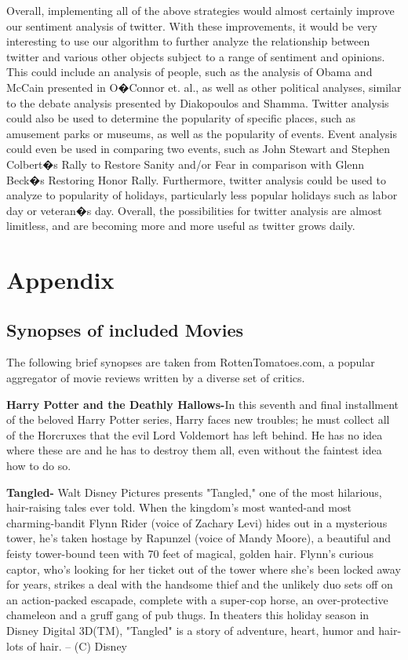 \documentclass[11pt]{article}
\begin{document}
Overall, implementing all of the above strategies would almost certainly improve our sentiment analysis of twitter.  With these improvements, it would be very interesting to use our algorithm to further analyze the relationship  between twitter and various other objects subject to a range of sentiment and opinions.  This could include an analysis of people, such as the analysis of Obama and McCain presented in O�Connor et. al., as well as other political analyses, similar to the debate analysis presented by Diakopoulos and Shamma.  Twitter analysis could also be used to determine the popularity of specific places, such as amusement parks or museums, as well as the popularity of events.  Event analysis could even be used in comparing two events, such as John Stewart and Stephen Colbert�s Rally to Restore Sanity and/or Fear in comparison with Glenn Beck�s Restoring Honor Rally.  Furthermore, twitter analysis could be used to analyze to popularity of holidays, particularly less popular holidays such as labor day or veteran�s day.  Overall, the possibilities for twitter analysis are almost limitless, and are becoming more and more useful as twitter grows daily.

\section{Appendix}
\subsection{Synopses of included Movies}
The following brief synopses are taken from RottenTomatoes.com, a popular aggregator of movie reviews written by a diverse set of critics.

\textbf{Harry Potter and the Deathly Hallows-}In this seventh and final installment of the beloved Harry Potter series, Harry faces new troubles; he must collect all of the Horcruxes that the evil Lord Voldemort has left behind. He has no idea where these are and he has to destroy them all, even without the faintest idea how to do so.
 
\textbf{Tangled-} Walt Disney Pictures presents "Tangled," one of the most hilarious, hair-raising tales ever told. When the kingdom's most wanted-and most charming-bandit Flynn Rider (voice of Zachary Levi) hides out in a mysterious tower, he's taken hostage by Rapunzel (voice of Mandy Moore), a beautiful and feisty tower-bound teen with 70 feet of magical, golden hair. Flynn's curious captor, who's looking for her ticket out of the tower where she's been locked away for years, strikes a deal with the handsome thief and the unlikely duo sets off on an action-packed escapade, complete with a super-cop horse, an over-protective chameleon and a gruff gang of pub thugs. In theaters this holiday season in Disney Digital 3D(TM), "Tangled" is a story of adventure, heart, humor and hair-lots of hair. -- (C) Disney
\end{document}

